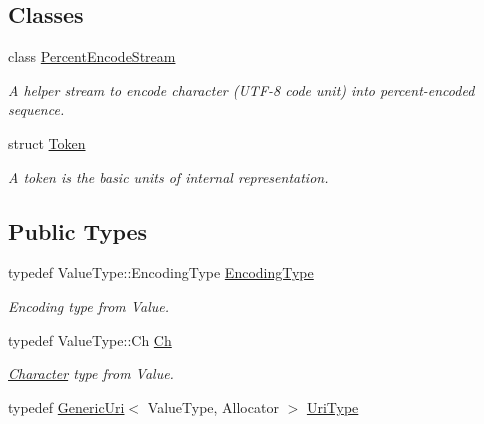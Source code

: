 \subsection*{Classes}
\begin{DoxyCompactItemize}
\item 
class \hyperlink{classGenericPointer_1_1PercentEncodeStream}{Percent\+Encode\+Stream}
\begin{DoxyCompactList}\small\item\em A helper stream to encode character (U\+T\+F-\/8 code unit) into percent-\/encoded sequence. \end{DoxyCompactList}\item 
struct \hyperlink{structGenericPointer_1_1Token}{Token}
\begin{DoxyCompactList}\small\item\em A token is the basic units of internal representation. \end{DoxyCompactList}\end{DoxyCompactItemize}
\subsection*{Public Types}
\begin{DoxyCompactItemize}
\item 
typedef Value\+Type\+::\+Encoding\+Type \hyperlink{classGenericPointer_a4b802da797a7a0b615fd9611cedb7c3b}{Encoding\+Type}
\begin{DoxyCompactList}\small\item\em Encoding type from Value. \end{DoxyCompactList}\item 
typedef Value\+Type\+::\+Ch \hyperlink{classGenericPointer_ab292356c11b4015c98d21b966b11f285}{Ch}
\begin{DoxyCompactList}\small\item\em \hyperlink{structCharacter}{Character} type from Value. \end{DoxyCompactList}\item 
typedef \hyperlink{classGenericUri}{Generic\+Uri}$<$ Value\+Type, Allocator $>$ \hyperlink{classGenericPointer_ac82bc56506218e49644bbbbe752a86cc}{Uri\+Type}
\end{DoxyCompactItemize}
